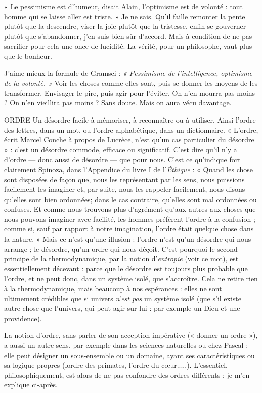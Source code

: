 « Le pessimisme est d’humeur, disait Alain, l’optimisme est de volonté :
tout homme qui se laisse aller est triste. » Je ne sais. Qu'il faille remonter la
pente plutôt que la descendre, viser la joie plutôt que la tristesse, enfin se gouverner
plutôt que s’abandonner, j’en suis bien sûr d’accord. Mais à condition
de ne pas sacrifier pour cela une once de lucidité. La vérité, pour un philosophe,
vaut plus que le bonheur.

J'aime mieux la formule de Gramsci : {\it « Pessimisme de l'intelligence, optimisme
de la volonté. »} Voir les choses comme elles sont, puis se donner les
moyens de les transformer. Envisager le pire, puis agir pour l’éviter. On n’en
mourra pas moins ? On n’en vieillira pas moins ? Sans doute. Mais on aura
vécu davantage.

ORDRE Un désordre facile à mémoriser, à reconnaître ou à utiliser. Ainsi
l’ordre des lettres, dans un mot, ou l’ordre alphabétique, dans un
dictionnaire. « L'ordre, écrit Marcel Conche à propos de Lucrèce, n’est qu’un
cas particulier du désordre » : c’est un désordre commode, efficace ou significatif.
C’est dire qu’il n’y a d’ordre — donc aussi de désordre — que pour nous.
C’est ce qu’indique fort clairement Spinoza, dans l’Appendice du livre I de
l'{\it Éthique} : « Quand les chose sont disposées de façon que, nous les représentant
par les sens, nous puissions facilement les imaginer et, par suite, nous les rappeler
facilement, nous disons qu’elles sont bien ordonnées; dans le cas
contraire, qu’elles sont mal ordonnées ou confuses. Et comme nous trouvons
plus d’agrément qu’aux autres aux choses que nous pouvons imaginer avec facilité,
les hommes préfèrent l’ordre à la confusion ; comme si, sauf par rapport à
notre imagination, l’ordre était quelque chose dans la nature. » Mais ce n’est
qu'une illusion : l’ordre n’est qu’un désordre qui nous arrange ; le désordre,
qu'un ordre qui nous déçoit. C’est pourquoi le second principe de la thermodynamique,
par la notion d’{\it entropie} (voir ce mot), est essentiellement
décevant : parce que le désordre est toujours plus probable que l’ordre, et ne
peut donc, dans un système isolé, que s’accroître. Cela ne retire rien à la thermodynamique,
mais beaucoup à nos espérances : elles ne sont ultimement crédibles
que si univers {\it n'est pas} un système isolé (que s’il existe autre chose que
l'univers, qui peut agir sur lui : par exemple un Dieu et une providence).

La notion d’ordre, sans parler de son acception impérative (« donner un
ordre »), a aussi un autre sens, par exemple dans les sciences naturelles ou chez
Pascal : elle peut désigner un sous-ensemble ou un domaine, ayant ses caractéristiques
ou sa logique propres (lordre des primates, l’ordre du cœur.....).
L'essentiel, philosophiquement, est alors de ne pas confondre des ordres
différents : je m’en explique ci-après.

